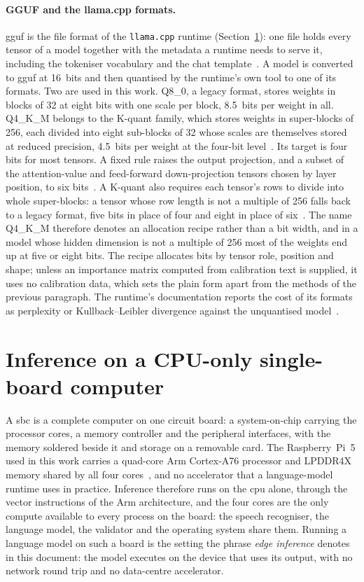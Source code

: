 \paragraph{GGUF and the llama.cpp formats.} \gls{gguf} is the file format of the
\texttt{llama.cpp} runtime (Section~\ref{sec:bg-edge}): one file holds every tensor of a model
together with the metadata a runtime needs to serve it, including the tokeniser vocabulary and the
chat template~\cite{llamacpp}. A model is converted to \gls{gguf} at 16~bits and then quantised by
the runtime's own tool to one of its formats. Two are used in this work. Q8\_0, a legacy format,
stores weights in blocks of 32 at eight bits with one scale per block, 8.5~bits per weight in
all. Q4\_K\_M belongs to the K-quant family, which stores weights in super-blocks of 256, each
divided into eight sub-blocks of 32 whose scales are themselves stored at reduced precision,
4.5~bits per weight at the four-bit level~\cite{llamacpp}. Its
target is four bits for most tensors. A fixed rule raises the output projection, and a subset of
the attention-value and feed-forward down-projection tensors chosen by layer position, to six
bits~\cite{llamacpp}. A K-quant also requires each tensor's rows to divide into whole
super-blocks: a tensor whose row length is not a multiple of 256 falls back to a legacy format,
five bits in place of four and eight in place of six~\cite{llamacpp}. The name Q4\_K\_M therefore
denotes an allocation recipe rather than a bit width, and in a model whose hidden dimension is
not a multiple of 256 most of the weights end up at five or eight bits. The recipe allocates bits
by tensor role, position and shape; unless an importance matrix computed from calibration text
is supplied, it uses no calibration data, which sets the plain form apart from the methods of the
previous paragraph. The runtime's documentation reports the cost of its formats as
perplexity or Kullback--Leibler divergence against the unquantised model~\cite{llamacpp}.

\section{Inference on a CPU-only single-board computer}
\label{sec:bg-edge}

A \gls{sbc} is a complete computer on one circuit board: a system-on-chip carrying the processor
cores, a memory controller and the peripheral interfaces, with the memory soldered beside it and
storage on a removable card. The Raspberry~Pi~5 used in this work carries a quad-core Arm
Cortex-A76 processor and LPDDR4X memory shared by all four cores~\cite{rpi5brief}, and no
accelerator that a language-model runtime uses in practice. Inference therefore runs on the
\gls{cpu} alone, through the vector instructions of the Arm architecture, and the four cores are
the only compute available to every process on the board: the speech recogniser, the language
model, the validator and the operating system share them. Running a language model on such a
board is the setting the phrase \emph{edge inference} denotes in this document: the model executes
on the device that uses its output, with no network round trip and no data-centre accelerator.

